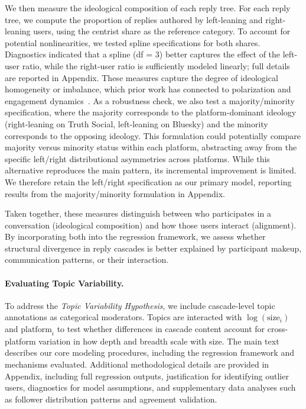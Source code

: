 \documentclass[letterpaper]{article} %
\begin{document}
We then measure the ideological composition of each reply tree. For each reply tree, we compute the proportion of replies authored by left-leaning and right-leaning users, using the centrist share as the reference category. To account for potential nonlinearities, we tested spline specifications for both shares. Diagnostics indicated that a spline (df = 3) better captures the effect of the left-user ratio, while the right-user ratio is sufficiently modeled linearly; full details are reported in Appendix. These measures capture the degree of ideological homogeneity or imbalance, which prior work has connected to polarization and engagement dynamics~\cite{conover_political_2011, garimella_political_2018, barbera_tweeting_2015}. As a robustness check, we also test a majority/minority specification, where the majority corresponds to the platform-dominant ideology (right-leaning on Truth Social, left-leaning on Bluesky) and the minority corresponds to the opposing ideology. This formulation could potentially compare majority versus minority status within each platform, abstracting away from the specific left/right distributional asymmetries across platforms. While this alternative reproduces the main pattern, its incremental improvement is limited. We therefore retain the left/right specification as our primary model, reporting results from the majority/minority formulation in Appendix.

Taken together, these measures distinguish between who participates in a conversation (ideological composition) and how those users interact (alignment). By incorporating both into the regression framework, we assess whether structural divergence in reply cascades is better explained by participant makeup, communication patterns, or their interaction.

\paragraph*{Evaluating Topic Variability.}

To address the \textit{Topic Variability Hypothesis}, we include cascade-level topic annotations as categorical moderators. Topics are interacted with $\log(\text{size}_i)$ and $\text{platform}_i$ to test whether differences in cascade content account for cross-platform variation in how depth and breadth scale with size.
The main text describes our core modeling procedures, including the regression framework and mechanisms evaluated. Additional methodological details are provided in Appendix, including full regression outputs, justification for identifying outlier users, diagnostics for model assumptions, and supplementary data analyses such as follower distribution patterns and agreement validation.
\end{document}
